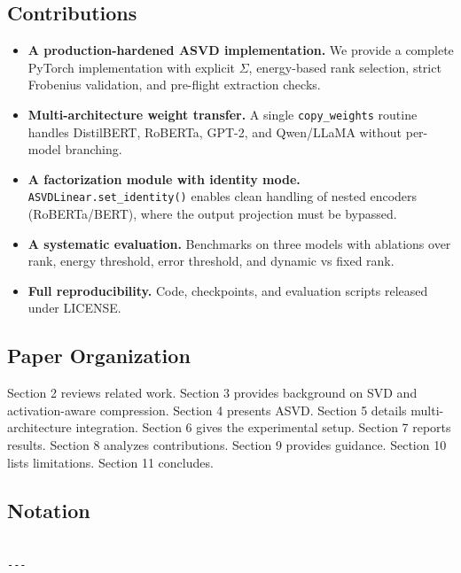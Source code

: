 \subsection{Contributions}

\begin{itemize}
\item \textbf{A production-hardened ASVD implementation.} We provide a complete
  PyTorch implementation with explicit $\Sigma$, energy-based rank selection,
  strict Frobenius validation, and pre-flight extraction checks.
\item \textbf{Multi-architecture weight transfer.} A single \texttt{copy\_weights} routine
  handles DistilBERT, RoBERTa, GPT-2, and Qwen/LLaMA without per-model
  branching.
\item \textbf{A factorization module with identity mode.} \texttt{ASVDLinear.set\_identity()}
  enables clean handling of nested encoders (RoBERTa/BERT), where the output
  projection must be bypassed.
\item \textbf{A systematic evaluation.} Benchmarks on three models with ablations
  over rank, energy threshold, error threshold, and dynamic vs fixed rank.
\item \textbf{Full reproducibility.} Code, checkpoints, and evaluation scripts
  released under {{LICENSE}}.

\end{itemize}
\subsection{Paper Organization}

Section 2 reviews related work. Section 3 provides background on SVD and 
activation-aware compression. Section 4 presents ASVD. Section 5 details 
multi-architecture integration. Section 6 gives the experimental setup. 
Section 7 reports results. Section 8 analyzes contributions. Section 9 
provides guidance. Section 10 lists limitations. Section 11 concludes.



\subsection{Notation}

\begin{lstlisting}

---
\end{lstlisting}